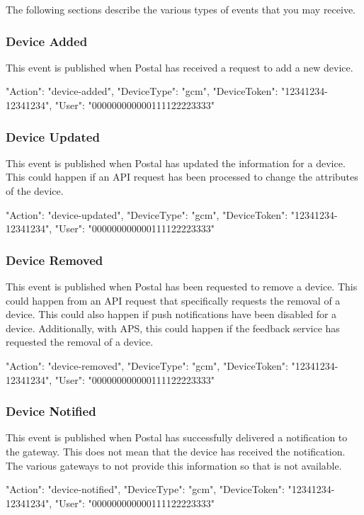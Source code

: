 \documentclass[12pt]{article}
\begin{document}
The following sections describe the various types of events that you may receive.

\subsubsection{Device Added}

This event is published when Postal has received a request to add a new device.

\begin{Terminal}
{
  "Action": "device-added",
  "DeviceType": "gcm",
  "DeviceToken": "12341234-12341234",
  "User": "000000000000111122223333"
}
\end{Terminal}

\subsubsection{Device Updated}

This event is published when Postal has updated the information for a device.
This could happen if an API request has been processed to change the attributes of the device.

\begin{Terminal}
{
  "Action": "device-updated",
  "DeviceType": "gcm",
  "DeviceToken": "12341234-12341234",
  "User": "000000000000111122223333"
}
\end{Terminal}

\subsubsection{Device Removed}

This event is published when Postal has been requested to remove a device.
This could happen from an API request that specifically requests the removal of a device.
This could also happen if push notifications have been disabled for a device.
Additionally, with APS, this could happen if the feedback service has requested the removal of a device.

\begin{Terminal}
{
  "Action": "device-removed",
  "DeviceType": "gcm",
  "DeviceToken": "12341234-12341234",
  "User": "000000000000111122223333"
}
\end{Terminal}

\subsubsection{Device Notified}

This event is published when Postal has successfully delivered a notification to the gateway.
This does not mean that the device has received the notification.
The various gateways to not provide this information so that is not available.

\begin{Terminal}
{
  "Action": "device-notified",
  "DeviceType": "gcm",
  "DeviceToken": "12341234-12341234",
  "User": "000000000000111122223333"
}
\end{Terminal}
\end{document}
